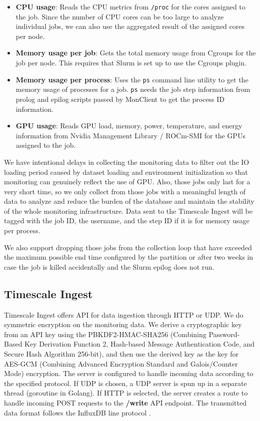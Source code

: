 \begin{itemize}
    \item \textbf{CPU usage}: Reads the CPU metrics from \texttt{/proc} for the cores assigned to the job. Since the number of CPU cores can be too large to analyze individual jobs, we can also use the aggregated result of the assigned cores per node.
    \item \textbf{Memory usage per job}: Gets the total memory usage from Cgroups for the job per node. This requires that Slurm is set up to use the Cgroups plugin.
    \item \textbf{Memory usage per process}: Uses the \texttt{ps} command line utility to get the memory usage of processes for a job. \texttt{ps} needs the job step information from prolog and epilog scripts passed by MonClient to get the process ID information.
    \item \textbf{GPU usage}: Reads GPU load, memory, power, temperature, and energy information from Nvidia Management Library / ROCm-SMI for the GPUs assigned to the job.
\end{itemize}

We have intentional delays in collecting the monitoring data to filter out the IO loading period caused by dataset loading and environment initialization so that monitoring can genuinely reflect the use of GPU. Also, those jobs only last for a very short time, so we only collect from those jobs with a meaningful length of data to analyze and reduce the burden of the database and maintain the stability of the whole monitoring infrastructure. Data sent to the Timescale Ingest will be tagged with the job ID, the username, and the step ID if it is for memory usage per process.

We also support dropping those jobs from the collection loop that have exceeded the maximum possible end time configured by the partition or after two weeks in case the job is killed accidentally and the Slurm epilog does not run.


\subsection{Timescale Ingest}

Timescale Ingest offers API for data ingestion through HTTP or UDP. We do symmetric encryption on the monitoring data. We derive a cryptographic key from an API key using the PBKDF2-HMAC-SHA256 (Combining Password-Based Key Derivation Function 2, Hash-based Message Authentication Code, and Secure Hash Algorithm 256-bit), and then use the derived key as the key for AES-GCM (Combining Advanced Encryption Standard and Galois/Counter Mode) encryption. The server is configured to handle incoming data according to the specified protocol. If UDP is chosen, a UDP server is spun up in a separate thread (goroutine in Golang). If HTTP is selected, the server creates a route to handle incoming POST requests to the \textbf{/write} API endpoint. The transmitted data format follows the InfluxDB line protocol \cite{influxlineprotocol}.

